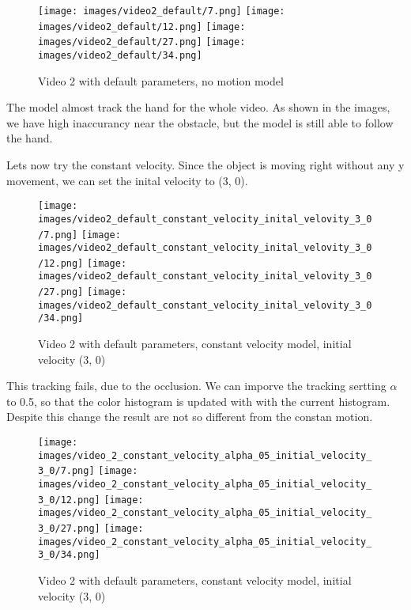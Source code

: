 \documentclass{ETHExercise}
\begin{document}
\begin{figure}[!h]
    \texttt{[image: images/video2\_default/7.png]}
  \endminipage
    \texttt{[image: images/video2\_default/12.png]}
  \endminipage
    \texttt{[image: images/video2\_default/27.png]}
  \endminipage\space
    \texttt{[image: images/video2\_default/34.png]}
  \endminipage
  \caption{Video 2 with default parameters, no motion model}
\end{figure}

The model almost track the hand for the whole video. As shown in the images,
we have high inaccurancy near the obstacle, but the model is still able to 
follow the hand.

Lets now try the constant velocity. Since the object is moving right without 
any y movement, we can set the inital velocity to (3, 0).

\begin{figure}[!h]
    \texttt{[image: images/video2\_default\_constant\_velocity\_inital\_velovity\_3\_0/7.png]}
  \endminipage
    \texttt{[image: images/video2\_default\_constant\_velocity\_inital\_velovity\_3\_0/12.png]}
  \endminipage
    \texttt{[image: images/video2\_default\_constant\_velocity\_inital\_velovity\_3\_0/27.png]}
  \endminipage\space
    \texttt{[image: images/video2\_default\_constant\_velocity\_inital\_velovity\_3\_0/34.png]}
  \endminipage
  \caption{Video 2 with default parameters, constant velocity model, initial velocity (3, 0)}
\end{figure}

This tracking fails, due to the occlusion. We can imporve the tracking sertting $\alpha$ to 0.5, 
so that the color histogram is updated with with the current histogram. Despite this change
the result are not so different from the constan motion.

\begin{figure}[!h]
    \texttt{[image: images/video\_2\_constant\_velocity\_alpha\_05\_initial\_velocity\_3\_0/7.png]}
  \endminipage
    \texttt{[image: images/video\_2\_constant\_velocity\_alpha\_05\_initial\_velocity\_3\_0/12.png]}
  \endminipage
    \texttt{[image: images/video\_2\_constant\_velocity\_alpha\_05\_initial\_velocity\_3\_0/27.png]}
  \endminipage\space
    \texttt{[image: images/video\_2\_constant\_velocity\_alpha\_05\_initial\_velocity\_3\_0/34.png]}
  \endminipage
  \caption{Video 2 with default parameters, constant velocity model, initial velocity (3, 0)}
\end{figure}
\end{document}
